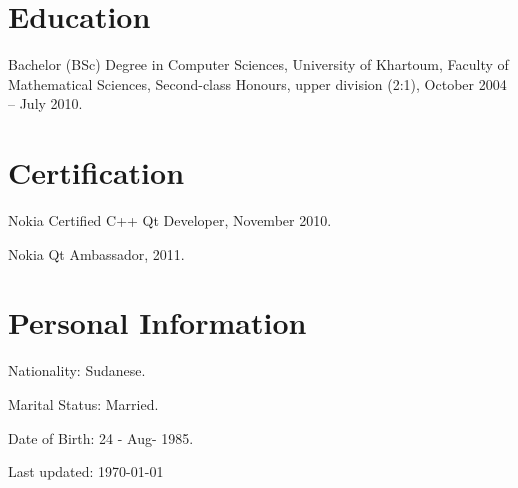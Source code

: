 \documentclass[letterpaper]{article}
\def\footerlink{}
\renewenvironment{itemize}{
  \begin{list}{}{
    \setlength{\leftmargin}{1.5em}
  }
}{
  \end{list}
}
\begin{document}
\section*{Education}
\begin{itemize}
\item Bachelor (BSc) Degree in Computer Sciences, University of Khartoum, Faculty of Mathematical Sciences, Second-class Honours, upper division (2:1), October 2004 -- July 2010.
\end{itemize}


\section*{Certification}
\begin{itemize}
\item Nokia Certified C++ Qt Developer, November 2010.
\item Nokia Qt Ambassador, 2011.
\end{itemize}



\section*{Personal Information}
\begin{itemize}
\item Nationality: {\small Sudanese.}
\item Marital Status: {\small Married.}
\item Date of Birth: {\small 24 - Aug- 1985.}
\end{itemize}

\bigskip

\begin{center}
  \begin{footnotesize}
    Last updated: \today \\
    \href{\footerlink}{\texttt{\footerlink}}
  \end{footnotesize}
\end{center}
\end{document}

